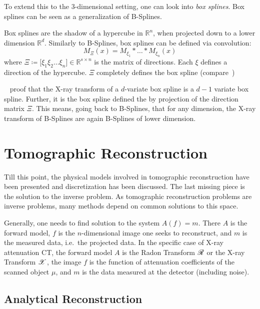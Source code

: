 To extend this to the \(3\)-dimensional setting, one can look into \textit{box splines}. Box splines
can be seen as a generalization of B-Splines.

\begin{definition}
	Box splines are the shadow of a hypercube in \(\mathbb{R}^n\), when projected down to a
	lower dimension \(\mathbb{R}^d\). Similarly to B-Splines, box splines can be defined via
	convolution:
	\begin{equation}
		M_\Xi(x) = M_{\xi_1} * \dots * M_{\xi_n}(x)
	\end{equation}
	where \(\Xi \coloneq \mathopen[ \xi_1 \xi_2 \dots \xi_n \mathclose] \in \mathbb{R}^{s \times n}\)
	is the matrix of directions. Each \(\xi\) defines a direction of the hypercube.
	\(\Xi\) completely defines the box spline (compare~\cite{de_boor_box_1993})
\end{definition}

\citeauthor{entezari_box_2012}~\cite{entezari_box_2012} proof that the X-ray transform of a
\(d\)-variate box spline is a \(d - 1\) variate box spline. Further, it is the box spline defined
the by projection of the direction matrix \(\Xi\). This means, going back to B-Splines, that for any
dimension, the X-ray transform of B-Splines are again B-Splines of lower dimension.

\chapter{Tomographic Reconstruction}\label{chap:tomographic_reconstruction}

Till this point, the physical models involved in tomographic reconstruction have been presented and
discretization has been discussed. The last missing piece is the solution to the inverse problem.
As tomographic reconstruction problems are inverse problems, many methods depend on common solutions
to this space.

Generally, one needs to find solution to the system \(A(f) = m\). There \(A\) is the forward model,
\(f\) is the \(n\)-dimensional image one seeks to reconstruct, and \(m\) is the measured data, i.e.\
the projected data. In the specific case of X-ray attenuation CT, the forward model \(A\) is the
Radon Transform \(\mathscr{R}\) or the X-ray Transform \(\mathscr{X}\), the image \(f\) is the function of
attenuation coefficients of the scanned object \(\mu\), and \(m\) is the data measured at the
detector (including noise).

\section{Analytical Reconstruction}\label{sec:analytical_reconstruction}


